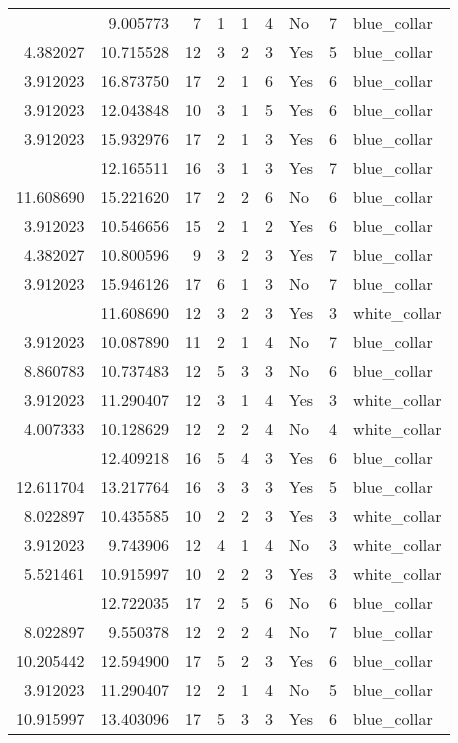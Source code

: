 \documentclass[
]{article}
\begin{document}
\begin{longtable}[t]{rrrrrllrl}
\addlinespace
3.912023 & 9.005773 & 7 & 1 & 1 & 4 & No & 7 & blue\_collar\\
4.382027 & 10.715528 & 12 & 3 & 2 & 3 & Yes & 5 & blue\_collar\\
3.912023 & 16.873750 & 17 & 2 & 1 & 6 & Yes & 6 & blue\_collar\\
3.912023 & 12.043848 & 10 & 3 & 1 & 5 & Yes & 6 & blue\_collar\\
3.912023 & 15.932976 & 17 & 2 & 1 & 3 & Yes & 6 & blue\_collar\\
\addlinespace
3.912023 & 12.165511 & 16 & 3 & 1 & 3 & Yes & 7 & blue\_collar\\
11.608690 & 15.221620 & 17 & 2 & 2 & 6 & No & 6 & blue\_collar\\
3.912023 & 10.546656 & 15 & 2 & 1 & 2 & Yes & 6 & blue\_collar\\
4.382027 & 10.800596 & 9 & 3 & 2 & 3 & Yes & 7 & blue\_collar\\
3.912023 & 15.946126 & 17 & 6 & 1 & 3 & No & 7 & blue\_collar\\
\addlinespace
6.476972 & 11.608690 & 12 & 3 & 2 & 3 & Yes & 3 & white\_collar\\
3.912023 & 10.087890 & 11 & 2 & 1 & 4 & No & 7 & blue\_collar\\
8.860783 & 10.737483 & 12 & 5 & 3 & 3 & No & 6 & blue\_collar\\
3.912023 & 11.290407 & 12 & 3 & 1 & 4 & Yes & 3 & white\_collar\\
4.007333 & 10.128629 & 12 & 2 & 2 & 4 & No & 4 & white\_collar\\
\addlinespace
11.225910 & 12.409218 & 16 & 5 & 4 & 3 & Yes & 6 & blue\_collar\\
12.611704 & 13.217764 & 16 & 3 & 3 & 3 & Yes & 5 & blue\_collar\\
8.022897 & 10.435585 & 10 & 2 & 2 & 3 & Yes & 3 & white\_collar\\
3.912023 & 9.743906 & 12 & 4 & 1 & 4 & No & 3 & white\_collar\\
5.521461 & 10.915997 & 10 & 2 & 2 & 3 & Yes & 3 & white\_collar\\
\addlinespace
12.899345 & 12.722035 & 17 & 2 & 5 & 6 & No & 6 & blue\_collar\\
8.022897 & 9.550378 & 12 & 2 & 2 & 4 & No & 7 & blue\_collar\\
10.205442 & 12.594900 & 17 & 5 & 2 & 3 & Yes & 6 & blue\_collar\\
3.912023 & 11.290407 & 12 & 2 & 1 & 4 & No & 5 & blue\_collar\\
10.915997 & 13.403096 & 17 & 5 & 3 & 3 & Yes & 6 & blue\_collar\\

\end{longtable}
\end{document}

